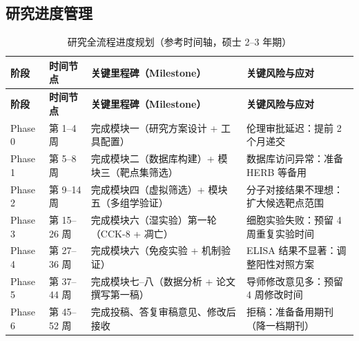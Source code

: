 \documentclass[12pt,a4paper,twoside]{article}
\begin{document}
\subsection{研究进度管理}
\label{sec:module9_timeline}

\begin{longtable}{p{1.5cm}p{3cm}p{5cm}p{4cm}}
\caption{研究全流程进度规划（参考时间轴，硕士 2--3 年期）} \label{tab:timeline} \\
\toprule
\textbf{阶段} & \textbf{时间节点} & \textbf{关键里程碑（Milestone）} & \textbf{关键风险与应对} \\
\midrule
\endfirsthead
\toprule
\textbf{阶段} & \textbf{时间节点} & \textbf{关键里程碑（Milestone）} & \textbf{关键风险与应对} \\
\midrule
\endhead
\bottomrule
\endlastfoot
Phase 0 & 第 1--4 周 & 完成模块一（研究方案设计 + 工具配置）& 伦理审批延迟：提前 2 个月递交 \\
\addlinespace
Phase 1 & 第 5--8 周 & 完成模块二（数据库构建）+ 模块三（靶点集筛选）& 数据库访问异常：准备 HERB 等备用 \\
\addlinespace
Phase 2 & 第 9--14 周 & 完成模块四（虚拟筛选）+ 模块五（多组学验证）& 分子对接结果不理想：扩大候选靶点范围 \\
\addlinespace
Phase 3 & 第 15--26 周 & 完成模块六（湿实验）第一轮（CCK-8 + 凋亡）& 细胞实验失败：预留 4 周重复实验时间 \\
\addlinespace
Phase 4 & 第 27--36 周 & 完成模块六（免疫实验 + 机制验证）& ELISA 结果不显著：调整阳性对照方案 \\
\addlinespace
Phase 5 & 第 37--44 周 & 完成模块七--八（数据分析 + 论文撰写第一稿）& 导师修改意见多：预留 4 周修改时间 \\
\addlinespace
Phase 6 & 第 45--52 周 & 完成投稿、答复审稿意见、修改后接收 & 拒稿：准备备用期刊（降一档期刊）\\
\bottomrule
\end{longtable}
\end{document}
